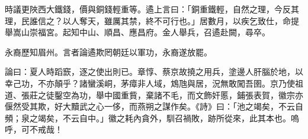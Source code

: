 \begin{pinyinscope}
 時議更陜西大鐵錢，價與銅錢輕重等。遹上言曰：「銅重鐵輕，自然之理，今反其理，民誰信之？以人奪天，雖厲其禁，終不可行也。」居數月，以疾乞致仕，命提舉嵩山崇福宮。起知中山、順昌、應昌府。金人舉兵，召遹赴闕，尋卒。



 永裔歷知眉州。言者論遹欺罔朝廷以軍功，永裔遂放罷。



 論曰：夏人時蹈窾，逐之使出則已。章惇、蔡京故撓之用兵，塗邊人肝腦於地，以幸己功，不亦顛乎？諸蠻溪峒，茅瘴非人域，鴆虺與居，況無敢闖吾圉。京乃使祖道、張莊之徒鑿空為功，舉中國重貲，棄諸不毛，而文飾奸慝，鋪張表賀，徽宗亦偃然受其欺，好大黷武之心一侈，而燕朔之謀作矣。《詩》曰：「池之竭矣，不云自頻；泉之竭矣，不云自中。」徽之耗內貪外，馴召禍敗，跡所從來，此其本也。嗚呼，可不戒哉！



\end{pinyinscope}